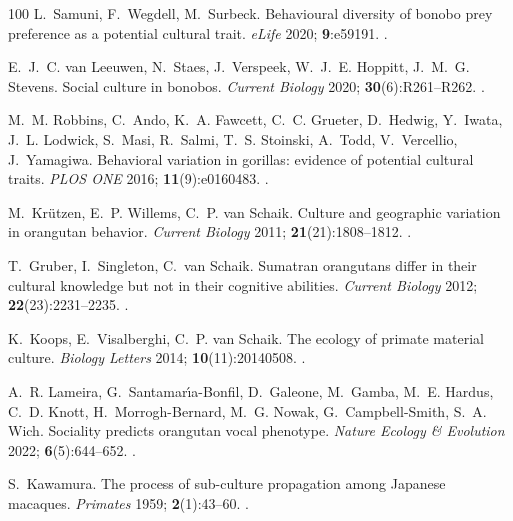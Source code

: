 \documentclass{ws-ijmpb}
\begin{document}
\begin{thebibliography}{100}
L.~Samuni, F.~Wegdell, M.~Surbeck. Behavioural diversity of bonobo prey
  preference as a potential cultural trait. \emph{eLife} 2020;
  \textbf{9}:e59191.
\newblock \href {http://doi.org/10.7554/eLife.59191}
  {}.

E.~J.~C. van Leeuwen, N.~Staes, J.~Verspeek, W.~J.~E. Hoppitt, J.~M.~G.
  Stevens. Social culture in bonobos. \emph{Current Biology} 2020;
  \textbf{30}(6):R261--R262.
\newblock \href {http://doi.org/10.1016/j.cub.2020.02.038}
  {}.

M.~M. Robbins, C.~Ando, K.~A. Fawcett, C.~C. Grueter, D.~Hedwig, Y.~Iwata,
  J.~L. Lodwick, S.~Masi, R.~Salmi, T.~S. Stoinski, A.~Todd, V.~Vercellio,
  J.~Yamagiwa. Behavioral variation in gorillas: evidence of potential cultural
  traits. \emph{PLOS ONE} 2016; \textbf{11}(9):e0160483.
\newblock \href {http://doi.org/10.1371/journal.pone.0160483}
  {}.

M.~Kr\"{u}tzen, E.~P. Willems, C.~P. van Schaik. Culture and geographic
  variation in orangutan behavior. \emph{Current Biology} 2011;
  \textbf{21}(21):1808--1812.
\newblock \href {http://doi.org/10.1016/j.cub.2011.09.017}
  {}.

T.~Gruber, I.~Singleton, C.~van Schaik. Sumatran orangutans differ in their
  cultural knowledge but not in their cognitive abilities. \emph{Current
  Biology} 2012; \textbf{22}(23):2231--2235.
\newblock \href {http://doi.org/10.1016/j.cub.2012.09.041}
  {}.

K.~Koops, E.~Visalberghi, C.~P. van Schaik. The ecology of primate material
  culture. \emph{Biology Letters} 2014; \textbf{10}(11):20140508.
\newblock \href {http://doi.org/10.1098/rsbl.2014.0508}
  {}.

A.~R. Lameira, G.~Santamar\'{\i}a-Bonfil, D.~Galeone, M.~Gamba, M.~E. Hardus,
  C.~D. Knott, H.~Morrogh-Bernard, M.~G. Nowak, G.~Campbell-Smith, S.~A. Wich.
  Sociality predicts orangutan vocal phenotype. \emph{Nature Ecology \&
  Evolution} 2022; \textbf{6}(5):644--652.
\newblock \href {http://doi.org/10.1038/s41559-022-01689-z}
  {}.

S.~Kawamura. The process of sub-culture propagation among {J}apanese macaques.
  \emph{Primates} 1959; \textbf{2}(1):43--60.
\newblock \href {http://doi.org/10.1007/BF01666110}
  {}.


\end{thebibliography}
\end{document}
